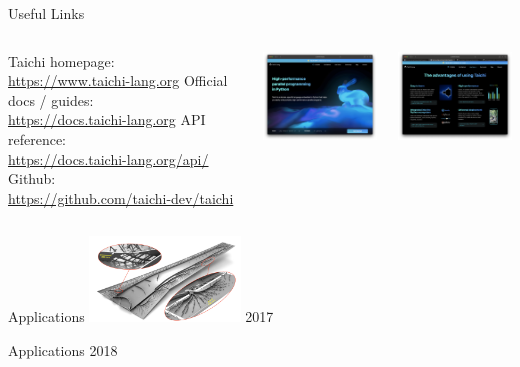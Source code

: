 \documentclass{beamer}[10pt]
\begin{document}
\begin{frame}{Useful Links}
\begin{columns}
\centering
\begin{outline}
  \1 Taichi homepage: \\ \url{https://www.taichi-lang.org}
  \1 Official docs / guides: \\ \url{https://docs.taichi-lang.org}
  \1 API reference: \\ \url{https://docs.taichi-lang.org/api/}
  \1 Github: \\ \url{https://github.com/taichi-dev/taichi}
\end{outline}
\centering

\includegraphics[width=4.0cm]{taichi_lang_org.png} 

\includegraphics[width=4.0cm]{taichi_lang_org_advantages.png} 

\end{columns}
\end{frame}

\begin{frame}{Applications}
  \includegraphics[width=4.0cm]{giga_opt_diagram.png}
  2017 \cite{Aage2017}
\end{frame}

\begin{frame}{Applications}
  2018 \cite{Liu2018}
\end{frame}
\end{document}
